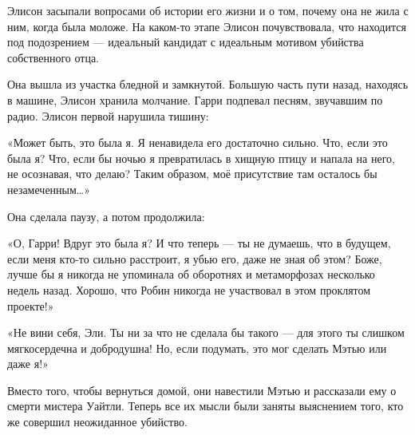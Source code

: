 \documentclass[a4paper,12pt]{book}
\begin{document}
\par
Элисон засыпали вопросами об истории его жизни и о том, почему она не жила с ним, когда была моложе. На каком-то этапе Элисон почувствовала, что находится под подозрением — идеальный кандидат с идеальным мотивом убийства собственного отца.\\
\par
Она вышла из участка бледной и замкнутой. Большую часть пути назад, находясь в машине, Элисон хранила молчание. Гарри подпевал песням, звучавшим по радио. Элисон первой нарушила тишину:
\par
«Может быть, это была я. Я ненавидела его достаточно сильно. Что, если это была я? Что, если бы ночью я превратилась в хищную птицу и напала на него, не осознавая, что делаю? Таким образом, моё присутствие там осталось бы незамеченным…»
\par
Она сделала паузу, а потом продолжила:
\par
«О, Гарри! Вдруг это была я? И что теперь — ты не думаешь, что в будущем, если меня кто-то сильно расстроит, я убью его, даже не зная об этом? Боже, лучше бы я никогда не упоминала об оборотнях и метаморфозах несколько недель назад. Хорошо, что Робин никогда не участвовал в этом проклятом проекте!»
\par
«Не вини себя, Эли. Ты ни за что не сделала бы такого — для этого ты слишком мягкосердечна и добродушна! Но, если подумать, это мог сделать Мэтью или даже я!»
\par
Вместо того, чтобы вернуться домой, они навестили Мэтью и рассказали ему о смерти мистера Уайтли. Теперь все их мысли были заняты выяснением того, кто же совершил неожиданное убийство.
\end{document}
